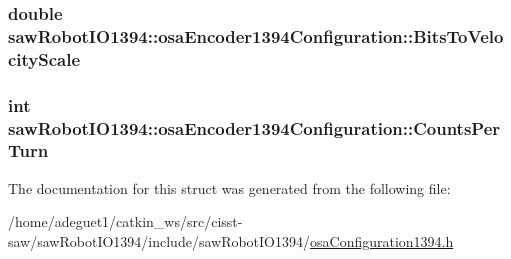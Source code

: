 \hypertarget{structsaw_robot_i_o1394_1_1osa_encoder1394_configuration_a746ed967a0547da052f09058b6c203ed}{
\subsubsection[{Bits\-To\-Velocity\-Scale}]{\setlength{\rightskip}{0pt plus 5cm}double saw\-Robot\-I\-O1394\-::osa\-Encoder1394\-Configuration\-::\-Bits\-To\-Velocity\-Scale}}\label{structsaw_robot_i_o1394_1_1osa_encoder1394_configuration_a746ed967a0547da052f09058b6c203ed}
\hypertarget{structsaw_robot_i_o1394_1_1osa_encoder1394_configuration_afd57b4ae73ec773c21015e4f7fbd33f9}{
\subsubsection[{Counts\-Per\-Turn}]{\setlength{\rightskip}{0pt plus 5cm}int saw\-Robot\-I\-O1394\-::osa\-Encoder1394\-Configuration\-::\-Counts\-Per\-Turn}}\label{structsaw_robot_i_o1394_1_1osa_encoder1394_configuration_afd57b4ae73ec773c21015e4f7fbd33f9}


The documentation for this struct was generated from the following file\-:\begin{DoxyCompactItemize}
\item 
/home/adeguet1/catkin\-\_\-ws/src/cisst-\/saw/saw\-Robot\-I\-O1394/include/saw\-Robot\-I\-O1394/\hyperlink{osa_configuration1394_8h}{osa\-Configuration1394.\-h}\end{DoxyCompactItemize}
